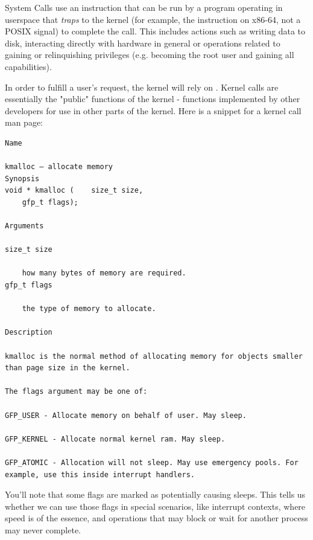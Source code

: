 System Calls use an instruction that can be run by a program operating in userspace that \textit{traps} to the kernel (for example, the  instruction on x86-64, not a POSIX signal) to complete the call.
This includes actions such as writing data to disk, interacting directly with hardware in general or operations related to gaining or relinquishing privileges (e.g.  becoming the root user and gaining all capabilities).

In order to fulfill a user's request, the kernel will rely on .
Kernel calls are essentially the "public" functions of the kernel - functions implemented by other developers for use in other parts of the kernel.
Here is a snippet for a kernel call man page:

\begin{lstlisting}
Name

kmalloc — allocate memory
Synopsis
void * kmalloc (	size_t size,
 	gfp_t flags);

Arguments

size_t size

    how many bytes of memory are required.
gfp_t flags

    the type of memory to allocate.

Description

kmalloc is the normal method of allocating memory for objects smaller than page size in the kernel.

The flags argument may be one of:

GFP_USER - Allocate memory on behalf of user. May sleep.

GFP_KERNEL - Allocate normal kernel ram. May sleep.

GFP_ATOMIC - Allocation will not sleep. May use emergency pools. For example, use this inside interrupt handlers.
\end{lstlisting}

You'll note that some flags are marked as potentially causing sleeps.
This tells us whether we can use those flags in special scenarios, like interrupt contexts, where speed is of the essence, and operations that may block or wait for another process may never complete.

